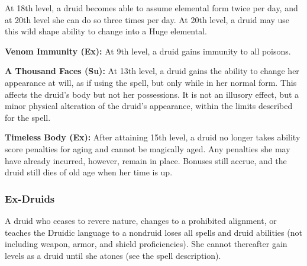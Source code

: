 At 18th level, a druid becomes able to assume elemental form twice per day, and at 20th level she can do so three times per day. At 20th level, a druid may use this wild shape ability to change into a Huge elemental.

\textbf{Venom Immunity (Ex):} At 9th level, a druid gains immunity to all poisons.

\textbf{A Thousand Faces (Su):} At 13th level, a druid gains the ability to change her appearance at will, as if using the  spell, but only while in her normal form. This affects the druid's body but not her possessions. It is not an illusory effect, but a minor physical alteration of the druid's appearance, within the limits described for the spell.

\textbf{Timeless Body (Ex):} After attaining 15th level, a druid no longer takes ability score penalties for aging and cannot be magically aged. Any penalties she may have already incurred, however, remain in place. Bonuses still accrue, and the druid still dies of old age when her time is up.

\subsubsection{Ex-Druids}
A druid who ceases to revere nature, changes to a prohibited alignment, or teaches the Druidic language to a nondruid loses all spells and druid abilities (not including weapon, armor, and shield proficiencies). She cannot thereafter gain levels as a druid until she atones (see the  spell description).



